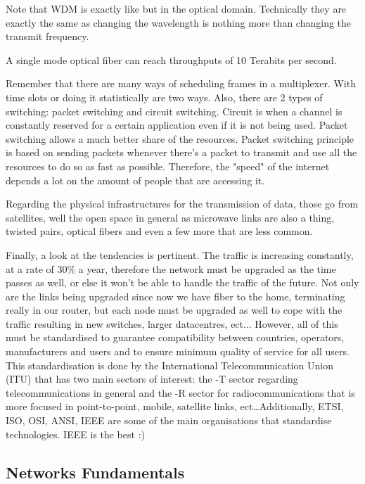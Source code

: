 Note that WDM is exactly like  but in the optical domain. Technically they are exactly the same as changing the wavelength is nothing more than changing the transmit frequency.

A single mode optical fiber can reach throughputs of 10 Terabits per second.

Remember that there are many ways of scheduling frames in a multiplexer. With time slots or doing it statistically are two ways. Also, there are 2 types of switching: packet switching and circuit switching. Circuit is when a channel is constantly reserved for a certain application even if it is not being used. Packet switching allows a much better share of the resources. Packet switching principle is based on sending packets whenever there's a packet to transmit and use all the resources to do so as fast as possible. Therefore, the "speed" of the internet depends a lot on the amount of people that are accessing it. 

Regarding the physical infrastructures for the transmission of data, those go from satellites, well the open space in general as microwave links are also a thing, twisted pairs, optical fibers and even a few more that are less common.

Finally, a look at the tendencies is pertinent. The traffic is increasing constantly, at a rate of 30\% a year, therefore the network must be upgraded as the time passes as well, or else it won't be able to handle the traffic of the future. Not only are the links being upgraded since now we have fiber to the home, terminating really in our router, but each node must be upgraded as well to cope with the traffic resulting in new switches, larger datacentres, ect... However, all of this must be standardised to guarantee compatibility between countries, operators, manufacturers and users and to ensure minimum quality of service for all users. This standardisation is done by the International Telecommunication Union (ITU) that has two main sectors of interest: the -T sector regarding telecommunications in general and the -R sector for radiocommunications that is more focused in point-to-point, mobile, satellite links, ect\dots Additionally, ETSI, ISO, OSI, ANSI, IEEE are some of the main organisations that standardise technologies. IEEE is the best :)



\subsection{Networks Fundamentals}

